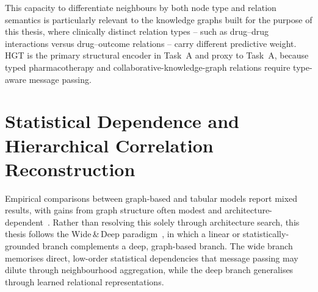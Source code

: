 This capacity to differentiate neighbours by both node type and
relation semantics is particularly relevant to the knowledge graphs
built for the purpose of this thesis, where clinically distinct relation types --
such as drug--drug interactions versus drug--outcome relations -- 
 carry different predictive weight. 
HGT is the primary structural encoder in Task~A and proxy to Task~A, because typed
pharmacotherapy and collaborative-knowledge-graph relations require type-aware message
passing. 







\section{Statistical Dependence and Hierarchical Correlation Reconstruction}
\label{sec:related-hcr}
\label{subsec:hcr_def}

Empirical comparisons between graph-based and tabular models report
mixed results, with gains from graph structure often modest and
architecture-dependent~\cite{tabgraphs2024,zhu2025stroketh}. Rather than
resolving this solely through architecture search, this thesis follows
the Wide\,\&\,Deep paradigm~\cite{cheng2016wideanddeep,gao2021wdgnn}, in
which a linear or statistically-grounded branch complements a deep,
graph-based branch. The wide branch memorises direct, low-order
statistical dependencies that message passing may dilute through
neighbourhood aggregation, while the deep branch generalises through
learned relational representations.  

